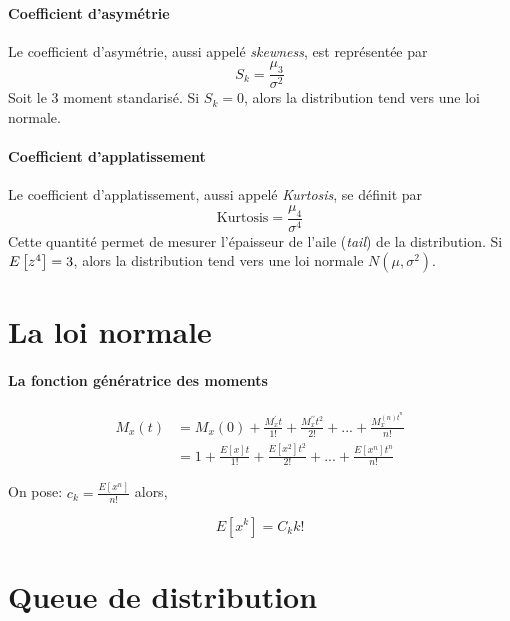 \documentclass[12pt, french]{report}
\begin{document}
\paragraph{Coefficient d'asymétrie}
Le coefficient d'asymétrie, aussi appelé \textit{skewness}, est représentée par
\begin{equation}
S_k = \frac{\mu_3}{\sigma^2}
\end{equation}
Soit le 3 moment standarisé. Si $S_k = 0$, alors la distribution tend vers une loi normale.

\paragraph{Coefficient d'applatissement}
Le coefficient d'applatissement, aussi appelé \textit{Kurtosis}, se définit par
\begin{equation}
\text{Kurtosis} = \frac{\mu_4}{\sigma^4}
\end{equation}
Cette quantité permet de mesurer l'épaisseur de l'aile (\textit{tail}) de la distribution. Si $E \left[ z^4 \right] =3$, alors la distribution tend vers une loi normale $N(\mu, \sigma^2)$.

\section{La loi normale}

\paragraph{La fonction génératrice des moments}
\begin{align*}
    M_x(t) &= M_x(0) + \frac{M_x^\prime t}{1!} + \frac{M_x^{\prime\prime} t^2}{2!} + ... + \frac{M_x^{(n) t^n}}{n!} \\
           &= 1 + \frac{E[x] t}{1!} + \frac{E[x^2] t^2}{2!} + ... + \frac{E[x^n] t^n}{n!}
\end{align*}

On pose: $c_k = \frac{E[x^n]}{n!}$ alors,

\begin{equation}
    E[x^k] = C_k k!
\end{equation}

\section{Queue de distribution}
\end{document}

